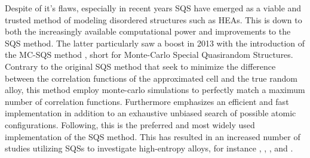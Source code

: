 Despite of it's flaws, especially in recent years SQS have emerged as a viable and trusted method of modeling disordered structures such as HEAs. This is down to both the increasingly available computational power and improvements to the SQS method. The latter particularly saw a boost in 2013 with the introduction of the MC-SQS method \cite{mcsqs2013}, short for Monte-Carlo Special Quasirandom Structures. Contrary to the original SQS method that seek to minimize the difference between the correlation functions of the approximated cell and the true random alloy, this method employ monte-carlo simulations to perfectly match a maximum number of correlation functions. Furthermore emphasizes an efficient and fast implementation in addition to an exhaustive unbiased search of possible atomic configurations. Following, this is the preferred and most widely used implementation of the SQS method. This has resulted in an increased number of studies utilizing SQSs to investigate high-entropy alloys, for instance \cite{WANG2021128754}, \cite{WEI2021167432}, \cite{RASHID2014285}, and \cite{SORKIN2021160776}.   






























































